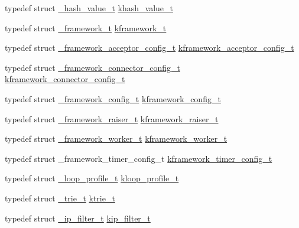 \begin{DoxyCompactItemize}
\item 
typedef struct \hyperlink{a00016}{\+\_\+hash\+\_\+value\+\_\+t} \hyperlink{a00066_aa13ac88a5567525fe44f3670134c3d96_aa13ac88a5567525fe44f3670134c3d96}{khash\+\_\+value\+\_\+t}
\item 
typedef struct \hyperlink{a00013}{\+\_\+framework\+\_\+t} \hyperlink{a00066_a3195a3be35782fc1efb920c811be111d_a3195a3be35782fc1efb920c811be111d}{kframework\+\_\+t}
\item 
typedef struct \hyperlink{a00009}{\+\_\+framework\+\_\+acceptor\+\_\+config\+\_\+t} \hyperlink{a00066_a39c993eb450173e4fde04498d757f9b6_a39c993eb450173e4fde04498d757f9b6}{kframework\+\_\+acceptor\+\_\+config\+\_\+t}
\item 
typedef struct \hyperlink{a00011}{\+\_\+framework\+\_\+connector\+\_\+config\+\_\+t} \hyperlink{a00066_a44d3033eba5a4fd784a741700a7a2521_a44d3033eba5a4fd784a741700a7a2521}{kframework\+\_\+connector\+\_\+config\+\_\+t}
\item 
typedef struct \hyperlink{a00010}{\+\_\+framework\+\_\+config\+\_\+t} \hyperlink{a00066_adeaf952e0f0887507ff836385bf54874_adeaf952e0f0887507ff836385bf54874}{kframework\+\_\+config\+\_\+t}
\item 
typedef struct \hyperlink{a00012}{\+\_\+framework\+\_\+raiser\+\_\+t} \hyperlink{a00066_af10637001508cbbf3a84f95c71318532_af10637001508cbbf3a84f95c71318532}{kframework\+\_\+raiser\+\_\+t}
\item 
typedef struct \hyperlink{a00014}{\+\_\+framework\+\_\+worker\+\_\+t} \hyperlink{a00066_af2a7f5b8406de73682f8bd4c2afee783_af2a7f5b8406de73682f8bd4c2afee783}{kframework\+\_\+worker\+\_\+t}
\item 
typedef struct \+\_\+framework\+\_\+timer\+\_\+config\+\_\+t \hyperlink{a00066_a6b9282027a882fd53a0d7247e69bc1c1_a6b9282027a882fd53a0d7247e69bc1c1}{kframework\+\_\+timer\+\_\+config\+\_\+t}
\item 
typedef struct \hyperlink{a00032}{\+\_\+loop\+\_\+profile\+\_\+t} \hyperlink{a00066_ab75a5c23099a6118c469ed160b277f28_ab75a5c23099a6118c469ed160b277f28}{kloop\+\_\+profile\+\_\+t}
\item 
typedef struct \hyperlink{a00049}{\+\_\+trie\+\_\+t} \hyperlink{a00066_a6b38314f31c4ed3eb36896383425a381_a6b38314f31c4ed3eb36896383425a381}{ktrie\+\_\+t}
\item 
typedef struct \hyperlink{a00017}{\+\_\+ip\+\_\+filter\+\_\+t} \hyperlink{a00066_a1c0c604eecd86fc8895cf4bbbba566af_a1c0c604eecd86fc8895cf4bbbba566af}{kip\+\_\+filter\+\_\+t}
\item 

\end{DoxyCompactItemize}
